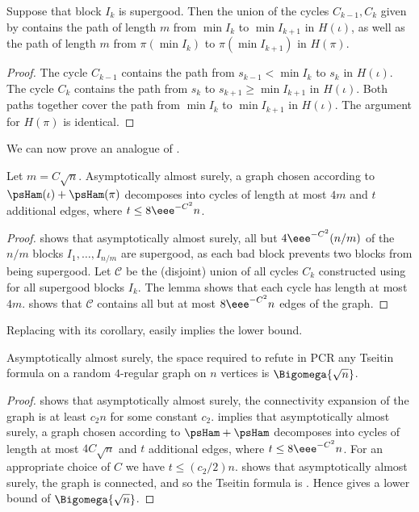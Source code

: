 \begin{lemma} \label{lem:supergood}
 Suppose that block $I_k$ is supergood. Then the union of the cycles $C_{k-1},C_k$ given by  contains the path of length $m$ from $\min I_k$ to $\min I_{k+1}$ in $H(\iota)$, as well as the path of length $m$ from $\pi(\min I_k)$ to $\pi(\min I_{k+1})$ in $H(\pi)$.
\end{lemma}
\begin{proof}
 The cycle $C_{k-1}$ contains the path from $s_{k-1} < \min I_k$ to $s_k$ in $H(\iota)$. The cycle $C_k$ contains the path from $s_k$ to $s_{k+1} \geq \min I_{k+1}$ in $H(\iota)$. Both paths together cover the path from $\min I_k$ to $\min I_{k+1}$ in $H(\iota)$. The argument for $H(\pi)$ is identical.
\end{proof}

We can now prove an analogue of .

\begin{lemma} \label{lem:almost-partition}
 Let $m = C\sqrt{n}$. Asymptotically almost surely, a graph chosen according to $\psHam(\iota) + \psHam(\pi)$ decomposes into cycles of %
 length at most $4m$ and $t$ additional edges, where $t \leq 8\eee^{-C^2}n$.
\end{lemma}
\begin{proof}
  shows that asymptotically almost surely, all but $4\eee^{-C^2} (n/m)$ of the $n/m$ blocks $I_1,\ldots,I_{n/m}$ are supergood, as each bad block prevents two blocks from being supergood. Let $\mathcal{C}$ be the (disjoint) union of all cycles $C_k$ constructed using  for all supergood blocks $I_k$. The lemma shows that each cycle has %
 length at most $4m$.  shows that $\mathcal{C}$ contains all but at most $8\eee^{-C^2} n$ edges of the graph.
\end{proof}

Replacing  with its corollary,  easily implies the lower bound.

\begin{theorem} \label{thm:improved}
 Asymptotically almost surely, the space required to refute in PCR any Tseitin formula on a random $4$-regular graph on $n$ vertices is $\Bigomega{\sqrt{n}}$.
\end{theorem}
\begin{proof}
   shows that asymptotically almost surely, the connectivity expansion of the graph is at least $c_2 n$ %
  for some constant $c_2$. %
   implies that asymptotically almost surely, a graph chosen according to $\psHam + \psHam$ decomposes into cycles of %
 length at most $4C\sqrt{n}$ and $t$ additional edges, where $t \leq 8\eee^{-C^2}n$. For an appropriate choice of $C$ we have $t \leq (c_2/2)n$.
  shows that asymptotically almost surely, the graph is connected, and so the Tseitin formula is \Gnonsplittingnot.
 Hence  gives a lower bound of $\Bigomega{\sqrt{n}}$.
\end{proof}

